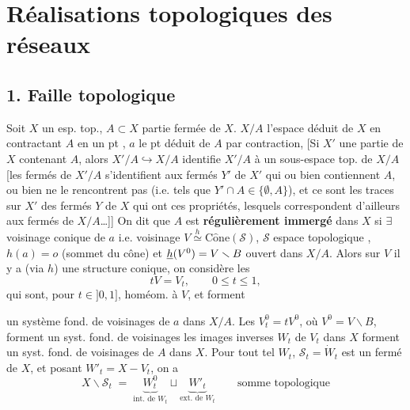 \documentclass[11pt,a4paper]{article}
\begin{document}
\section{Réalisations topologiques des réseaux}


\subsection{1. Faille topologique}

Soit $X$ un esp. top., $A \subset X$ partie fermée  de $X$. \struck{\ill{}} $X/A$ l'espace déduit de $X$ en contractant $A$ en un pt , $a$ le pt déduit de $A$ par contraction, [Si  $X'$  une partie de $X$ contenant $A$, alors $X'/A \hookrightarrow X/A$ identifie $X'/A$ à un sous-espace top. de $X/A$ [les fermés de $X'/A$ s'identifient aux fermés $Y'$ de $X'$ qui ou bien contiennent $A$, ou bien ne le rencontrent pas (i.e. tels que $Y' \cap A \in \{\emptyset, A\}$), et ce sont les traces sur $X'$ des fermés $Y$ de $X$ qui ont ces propriétés, lesquels correspondent d'ailleurs aux fermés de $X/A$…]] On dit que $A$ est \textbf{régulièrement immergé} dans $X$ si $\exists$ voisinage \struck{\ill{}} conique de $a$ i.e. voisinage  $V \overset{h}{\simeq} \mathrm{C\hat{o}ne}(\mathcal{S})$, $\mathcal{S}$ espace topologique , $h(a) = o$ (sommet du cône) et $\uncertain{h}(V^{0}) = V \smallsetminus B$ ouvert dans $X/A$.  Alors  sur $V$ il y a (via $h$) une structure conique,  on considère les
\[
  tV = V_t, \qquad 0 \leq t \leq 1,
\]
qui sont, pour $t \in {]0,1]}$, homéom. à $V$, et forment

un système fond. de voisinages de $a$ dans $X/A$. Les $V_t^{0} = t V^{0}$, où $V^{0} = V \smallsetminus B$, forment un syst. fond. de voisinages\supplied{ ;} les images inverses $W_t$ de $V_t$ dans $X$ forment un syst. fond. de voisinages de $A$ dans $X$. Pour tout tel $W_t$, \struck{\ill{}} $\mathcal{S}_t = \dot{W}_t$  est un fermé de $X$, et \struck{\ill{}} posant $W'_t = X - V_t$, on a
\[
  X \smallsetminus \mathcal{S}_t \;=\; \underbrace{W_t^{0}}_{\text{int. de } W_t} \sqcup \underbrace{W'_t}_{\text{ext. de } W_t} \qquad \text{somme topologique}
\]
\end{document}
